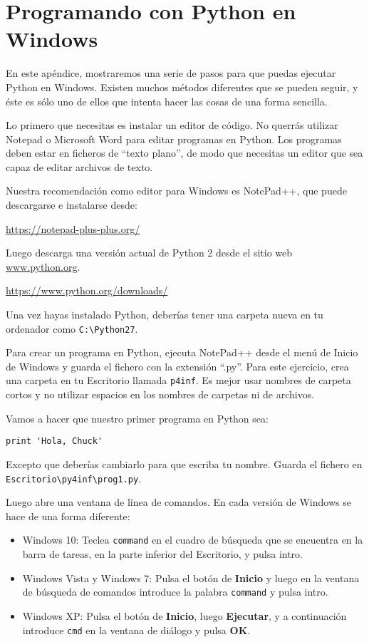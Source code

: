 
\chapter{Programando con Python en Windows}

En este apéndice, mostraremos una serie de pasos
para que puedas ejecutar Python en Windows. Existen muchos métodos
diferentes que se pueden seguir, y éste es sólo uno de ellos
que intenta hacer las cosas de una forma sencilla.

Lo primero que necesitas es instalar un editor de código. No
querrás utilizar Notepad o Microsoft Word para editar
programas en Python. Los programas deben estar en ficheros de ``texto plano'',
de modo que necesitas un editor que sea capaz de
editar archivos de texto.

Nuestra recomendación como editor para Windows es NotePad++, que
puede descargarse e instalarse desde:

\url{https://notepad-plus-plus.org/}

Luego descarga una versión actual de Python 2 desde el
sitio web \url{www.python.org}.

\url{https://www.python.org/downloads/}

Una vez hayas instalado Python, deberías tener una
carpeta nueva en tu ordenador como {\tt C:{\textbackslash}Python27}.

Para crear un programa en Python, ejecuta NotePad++ desde el menú de Inicio de Windows
y guarda el fichero con la extensión ``.py''. Para este
ejercicio, crea una carpeta en tu Escritorio llamada
{\tt p4inf}. Es mejor usar nombres de carpeta cortos
y no utilizar espacios en los nombres de carpetas ni de archivos.

Vamos a hacer que nuestro primer programa en Python sea:

\beforeverb
\begin{verbatim}
print 'Hola, Chuck'
\end{verbatim}
\afterverb
%
Excepto que deberías cambiarlo para que escriba tu nombre. Guarda el fichero
en {\tt Escritorio{\textbackslash}py4inf{\textbackslash}prog1.py}.

Luego abre una ventana de línea de comandos. En cada versión de Windows
se hace de una forma diferente:

\begin{itemize}
\item Windows 10: Teclea {\tt command} en el cuadro de búsqueda
que se encuentra en la barra de tareas, en la parte inferior del Escritorio,
y pulsa intro.
	
\item Windows Vista y Windows 7: Pulsa el botón de {\bf Inicio}
y luego en la ventana de búsqueda de comandos introduce la palabra
{\tt command} y pulsa intro.

\item Windows XP: Pulsa el botón de {\bf Inicio}, luego {\bf Ejecutar}, y
a continuación introduce {\tt cmd} en la ventana de diálogo y pulsa {\bf OK}.
\end{itemize}

